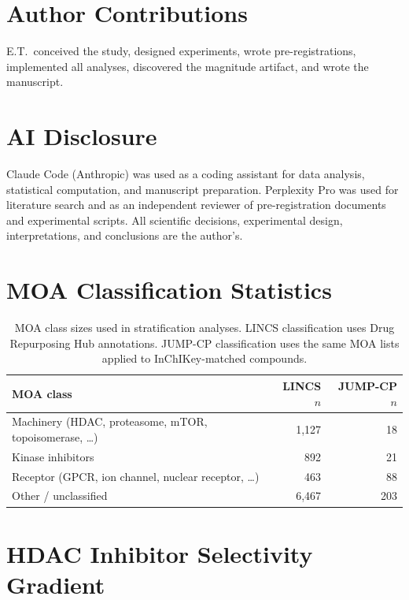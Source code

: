\documentclass[11pt]{article}
\begin{document}
\section*{Author Contributions}

E.T.\ conceived the study, designed experiments, wrote
pre-registrations, implemented all analyses, discovered the magnitude
artifact, and wrote the manuscript.

\section*{AI Disclosure}

Claude Code (Anthropic) was used as a coding assistant for data
analysis, statistical computation, and manuscript preparation.
Perplexity Pro was used for literature search and as an independent
reviewer of pre-registration documents and experimental scripts.
All scientific decisions, experimental design, interpretations, and
conclusions are the author's.




\appendix

\section{MOA Classification Statistics}
\label{app:moa}

\begin{table}[h]
\centering
\caption{MOA class sizes used in stratification analyses. LINCS
classification uses Drug Repurposing Hub annotations. JUMP-CP
classification uses the same MOA lists applied to InChIKey-matched
compounds.}
\begin{tabular}{lrr}
\toprule
MOA class & LINCS $n$ & JUMP-CP $n$ \\
\midrule
Machinery (HDAC, proteasome, mTOR, topoisomerase, \ldots) & 1{,}127 & 18 \\
Kinase inhibitors & 892 & 21 \\
Receptor (GPCR, ion channel, nuclear receptor, \ldots) & 463 & 88 \\
Other / unclassified & 6{,}467 & 203 \\
\bottomrule
\end{tabular}
\end{table}

\section{HDAC Inhibitor Selectivity Gradient}
\label{app:hdac}
\end{document}
